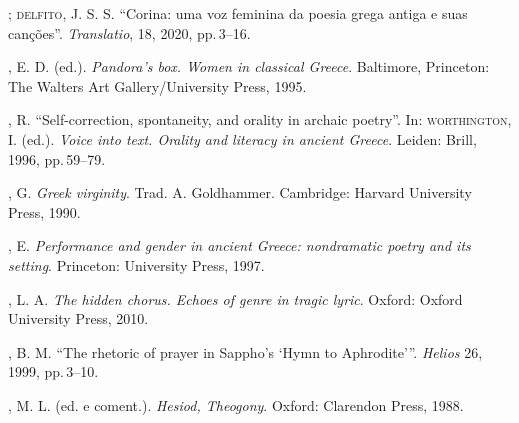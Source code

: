 \begin{bibliohedra}
\titidem; \textsc{delfito}, J. S. S. “Corina: uma voz feminina da poesia grega antiga e suas canções”. \textit{Translatio},  18, 2020, pp.\,3--16.

, E. D. (ed.). \textit{Pandora’s box. Women in classical Greece}. Baltimore, Princeton: The Walters Art Gallery/University Press, 1995.


, R. “Self-correction, spontaneity, and orality in archaic poetry”. In: \textsc{worthington}, I. (ed.). \textit{Voice into text. Orality and literacy in ancient Greece}. Leiden: Brill, 1996, pp.\,59--79.

, G. \textit{Greek virginity}. Trad. A. Goldhammer. Cambridge: Harvard University Press, 1990.

, E. \textit{Performance and gender in ancient Greece: nondramatic poetry and its setting}. Princeton: University Press, 1997.

, L. A. \textit{The hidden chorus. Echoes of genre in tragic lyric}. Oxford: Oxford University Press, 2010.

, B. M. “The rhetoric of prayer in Sappho's `Hymn to Aphrodite'”. \textit{Helios} 26, 1999, pp.\,3--10.

, M. L. (ed. e coment.). \textit{Hesiod, Theogony}. Oxford: Clarendon Press, 1988.


\end{bibliohedra}

